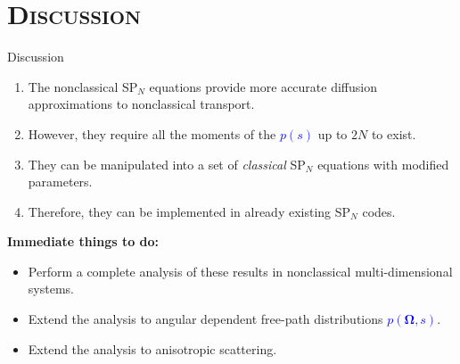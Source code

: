 \documentclass[xcolor=x11names, compress]{beamer}
\renewcommand{\(}{\begin{columns}}
\renewcommand{\)}{\end{columns}}
\newcommand{\<}[1]{\begin{column}{#1}}
\renewcommand{\>}{\end{column}}
\newcommand{\uom}{{\bm\Omega}}
\begin{document}
\section{\scshape Discussion}


\begin{frame}[fragile]{Discussion}
\begin{enumerate}
\item The nonclassical SP$_N$ equations provide more accurate diffusion approximations to nonclassical transport.
\item  However, they require all the moments of the \textcolor{blue}{$p(s)$} up to $2N$ to exist.
\item They can be manipulated into a set of \textit{classical} SP$_N$ equations with modified parameters.
\item Therefore, they can be implemented in already existing SP$_N$ codes.
\end{enumerate}
\pause

\textbf{Immediate things to do:}
\begin{itemize}
\item Perform a complete analysis of these results in nonclassical multi-dimensional systems.
\item Extend the analysis to angular dependent free-path distributions \textcolor{blue}{$p(\uom,s)$}.
\item Extend the analysis to anisotropic scattering.
\end{itemize}
\end{frame}
\end{document}
